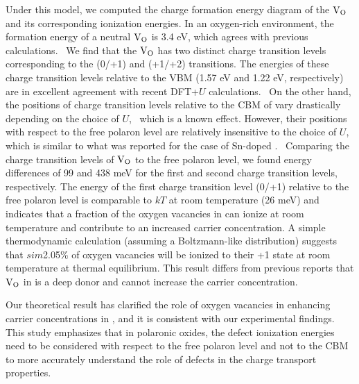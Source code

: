 Under this model, we computed the charge formation energy diagram of the $\rm V_O$ and its corresponding ionization energies. In an oxygen-rich environment, the formation energy of a neutral $\rm V_O$ is 3.4 eV, which agrees with previous calculations.~\cite{paudel2012intrinsic,kay2006new,zhang2010density,shimada2016multiferroic} We find that the $\rm V_O$ has two distinct charge transition levels corresponding to the (0/+1) and (+1/+2) transitions. The energies of these charge transition levels relative to the VBM (1.57 eV and 1.22 eV, respectively) are in excellent agreement with recent DFT+$U$ calculations.~\cite{geneste2019polarons} On the other hand, the positions of charge transition levels relative to the CBM of  vary drastically depending on the choice of $U$,~\cite{paudel2012intrinsic,geneste2019polarons,zhang2010density} which is a known effect. However, their positions with respect to the free polaron level are relatively insensitive to the choice of $U$, which is similar to what was reported for the case of Sn-doped .~\cite{smart2017effect} Comparing the charge transition levels of $\rm V_O$ to the free polaron level, we found energy differences of 99 and 438 meV for the first and second charge transition levels, respectively. The energy of the first charge transition level (0/+1) relative to the free polaron level is comparable to $kT$ at room temperature (26 meV) and indicates that a fraction of the oxygen vacancies in  can ionize at room temperature and contribute to an increased carrier concentration. A simple thermodynamic calculation (assuming a Boltzmann-like distribution) suggests that $sim$2.05\% of oxygen vacancies will be ionized to their +1 state at room temperature at thermal equilibrium. This result differs from previous reports that $\rm V_O$ in  is a deep donor and cannot increase the carrier concentration.~\cite{paudel2012intrinsic,kay2006new,zhang2010density,shimada2016multiferroic}

Our theoretical result has clarified the role of oxygen vacancies in enhancing carrier concentrations in , and it is consistent with our experimental findings. This study emphasizes that in polaronic oxides, the defect ionization energies need to be considered with respect to the free polaron level and not to the CBM to more accurately understand the role of defects in the charge transport properties.



